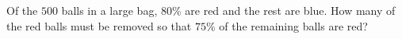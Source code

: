 Of the $500$ balls in a large bag, $80\%$ are red and the rest are blue. How many of the red balls must be removed so that $75\%$ of the remaining balls are red?
